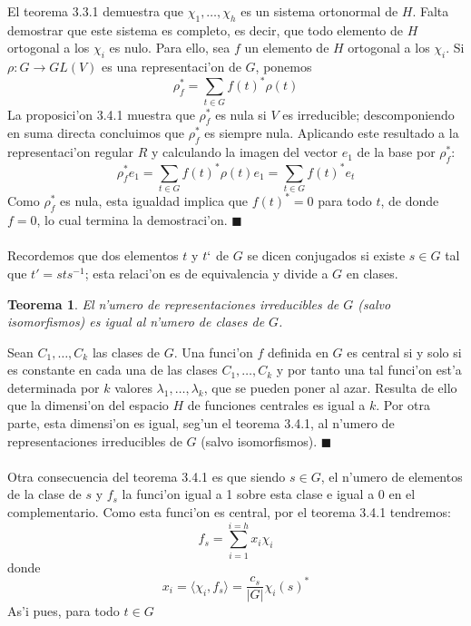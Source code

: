 \documentclass[a4paper,openright,12pt]{book}
\numberwithin{equation}{section} %
\newtheorem{teorema}{Teorema}[section] %
\newenvironment{proof}{\noindent{\it Demostracion:}}{\hfill$\blacksquare$} %
\begin{document}
\begin{proof}
El teorema 3.3.1 demuestra que $\chi_{1}, \ldots ,\chi_{h}$ es un sistema ortonormal de $H$. Falta demostrar que este sistema es completo, es decir, que todo elemento de $H$ ortogonal a los $\chi_{i}$ es nulo. Para ello, sea $f$ un elemento de $H$ ortogonal a los $\chi_{i}$. Si $\rho : G \rightarrow GL(V)$ es una representaci'on de $G$, ponemos
\[
\rho_{f}^{*}=\sum_{t \in G}f(t)^{*}\rho (t)
\]
La proposici'on 3.4.1 muestra que $\rho_{f}^{*}$ es nula si $V$ es irreducible; descomponiendo en suma directa concluimos que $\rho_{f}^{*}$ es siempre nula. Aplicando este resultado a la representaci'on regular $R$ y calculando la imagen del vector $e_{1}$ de la base por $\rho_{f}^{*}$:
\[
\rho_{f}^{*}e_{1}=\sum_{t \in G} f(t)^{*}\rho(t)e_{1}=\sum_{t \in G}f(t)^{*}e_{t}
\]
Como $\rho_{f}^{*}$ es nula, esta igualdad implica que $f(t)^{*}=0$ para todo $t$, de donde $f=0$, lo cual termina la demostraci'on.
\end{proof}\\
\\
Recordemos que dos elementos $t$ y $t`$ de $G$ se dicen conjugados si existe $s \in G$ tal que $t'=sts^{-1}$; esta relaci'on es de equivalencia y divide a $G$ en clases.
\begin{teorema}
El n'umero de representaciones irreducibles de $G$ (salvo isomorfismos) es igual al n'umero de clases de $G$.
\end{teorema}
\begin{proof}
Sean $C_{1}, \ldots ,C_{k}$ las clases de $G$. Una funci'on $f$ definida en $G$ es central si y solo si es constante en cada una de las clases $C_{1}, \ldots ,C_{k}$ y por tanto una tal funci'on est'a determinada por $k$ valores $\lambda_{1}, \ldots ,\lambda_{k}$, que se pueden poner al azar. Resulta de ello que la dimensi'on del espacio $H$ de funciones centrales es igual a $k$. Por otra parte, esta dimensi'on es igual, seg'un el teorema 3.4.1, al n'umero de representaciones irreducibles de $G$ (salvo isomorfismos).
\end{proof}\\
\\
Otra consecuencia del teorema 3.4.1 es que siendo $s\in G$, el n'umero de elementos de la clase de $s$ y $f_{s}$ la funci'on igual a 1 sobre esta clase e igual a 0 en el complementario. Como esta funci'on es central, por el teorema 3.4.1 tendremos:
\[
f_{s}=\sum_{i=1}^{i=h}x_{i}\chi_{i}
\]
donde
\[
x_{i}=\langle \chi_{i} , f_{s} \rangle = \frac{c_{s}}{|G|}\chi_{i}(s)^{*}
\]
As'i pues, para todo $t \in G$
\end{document}
